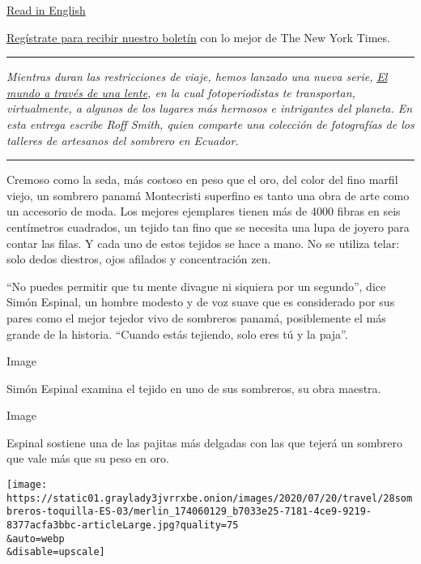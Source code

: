 \href{https://www.nytimes3xbfgragh.onion/2020/07/20/travel/panama-hats-ecuador.html}{Read
in English}

\href{https://www.nytimes3xbfgragh.onion/newsletters/el-times}{Regístrate
para recibir nuestro boletín} con lo mejor de The New York Times.

\begin{center}\rule{0.5\linewidth}{\linethickness}\end{center}

\emph{Mientras duran las restricciones de viaje, hemos lanzado una nueva
serie,}
\href{https://www.nytimes3xbfgragh.onion/column/the-world-through-a-lens}{\emph{El
mundo a través de una lente}}\emph{, en la cual fotoperiodistas te
transportan, virtualmente, a algunos de los lugares más hermosos e
intrigantes del planeta. En esta entrega escribe Roff Smith, quien
comparte una colección de fotografías de los talleres de artesanos del
sombrero en Ecuador.}

\begin{center}\rule{0.5\linewidth}{\linethickness}\end{center}

Cremoso como la seda, más costoso en peso que el oro, del color del fino
marfil viejo, un sombrero panamá Montecristi superfino es tanto una obra
de arte como un accesorio de moda. Los mejores ejemplares tienen más de
4000 fibras en seis centímetros cuadrados, un tejido tan fino que se
necesita una lupa de joyero para contar las filas. Y cada uno de estos
tejidos se hace a mano. No se utiliza telar: solo dedos diestros, ojos
afilados y concentración zen.

``No puedes permitir que tu mente divague ni siquiera por un segundo'',
dice Simón Espinal, un hombre modesto y de voz suave que es considerado
por sus pares como el mejor tejedor vivo de sombreros panamá,
posiblemente el más grande de la historia. ``Cuando estás tejiendo, solo
eres tú y la paja''.

Image

Simón Espinal examina el tejido en uno de sus sombreros, su obra
maestra.

Image

Espinal sostiene una de las pajitas más delgadas con las que tejerá un
sombrero que vale más que su peso en oro.

\texttt{[image: https://static01.graylady3jvrrxbe.onion/images/2020/07/20/travel/28sombreros-toquilla-ES-03/merlin\_174060129\_b7033e25-7181-4ce9-9219-8377acfa3bbc-articleLarge.jpg?quality=75\\\&auto=webp\\\&disable=upscale]}

